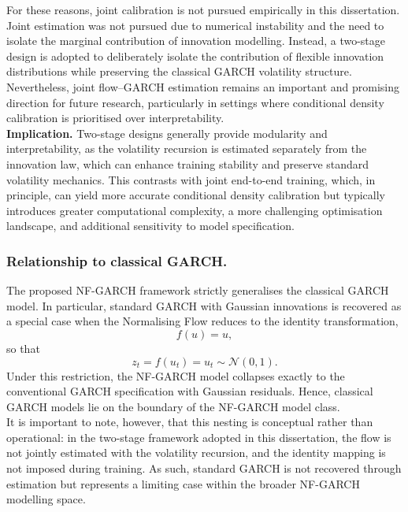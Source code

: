 \documentclass[oneside,12pt]{CUEDthesisPSnPDF}
\begin{document}
For these reasons, joint calibration is not pursued empirically in this dissertation. Joint estimation was not pursued due to numerical instability and the need to isolate the marginal contribution of innovation modelling. Instead, a two-stage design is adopted to deliberately isolate the contribution of flexible innovation distributions while preserving the classical GARCH volatility structure. Nevertheless, joint flow--GARCH estimation remains an important and promising direction for future research, particularly in settings where conditional density calibration is prioritised over interpretability.\\

\medskip
\noindent
\textbf{Implication.}
Two-stage designs generally provide modularity and interpretability, as the volatility recursion is estimated separately from the innovation law, which can enhance training stability and preserve standard volatility mechanics. This contrasts with joint end-to-end training, which, in principle, can yield more accurate conditional density calibration but typically introduces greater computational complexity, a more challenging optimisation landscape, and additional sensitivity to model specification.\\

\subsubsection{Relationship to classical GARCH.}
The proposed NF-GARCH framework strictly generalises the classical GARCH model. In particular, standard GARCH with Gaussian innovations is recovered as a special case when the Normalising Flow reduces to the identity transformation,\\
\[
f(u) = u,
\]
so that
\[
z_t = f(u_t) = u_t \sim \mathcal{N}(0,1).
\]
Under this restriction, the NF-GARCH model collapses exactly to the conventional GARCH specification with Gaussian residuals. Hence, classical GARCH models lie on the boundary of the NF-GARCH model class.\\

It is important to note, however, that this nesting is conceptual rather than operational: in the two-stage framework adopted in this dissertation, the flow is not jointly estimated with the volatility recursion, and the identity mapping is not imposed during training. As such, standard GARCH is not recovered through estimation but represents a limiting case within the broader NF-GARCH modelling space.\\
\end{document}
